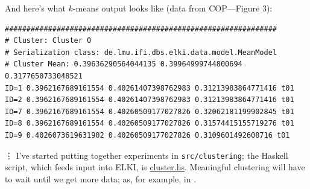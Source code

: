 \documentclass[10pt]{report}
\begin{document}
And here's what $k$-means output looks like (data from COP---Figure 3):
\begin{verbatim}
###############################################################
# Cluster: Cluster 0
# Serialization class: de.lmu.ifi.dbs.elki.data.model.MeanModel
# Cluster Mean: 0.39636290564044135 0.39964999744800694 0.3177650733048521
ID=1 0.3962167689161554 0.40261407398762983 0.31213983864771416 t01
ID=2 0.3962167689161554 0.40261407398762983 0.31213983864771416 t01
ID=7 0.3962167689161554 0.40260509177027826 0.32062181199902845 t01
ID=8 0.3962167689161554 0.40260509177027826 0.31574415155719276 t01
ID=9 0.4026073619631902 0.40260509177027826 0.3109601492608716 t01
\end{verbatim}
\vdots
I've started putting together experiments in \verb=src/clustering=; the Haskell script, which feeds input into ELKI, is \href{run:src/cluster.hs}{cluster.hs}.
Meaningful clustering will have to wait until we get more data; as, for example, in \cite[pp. :14--34:16 (see Tables I--V)]{Patnaik2011}.

  \appendix
\end{document}
